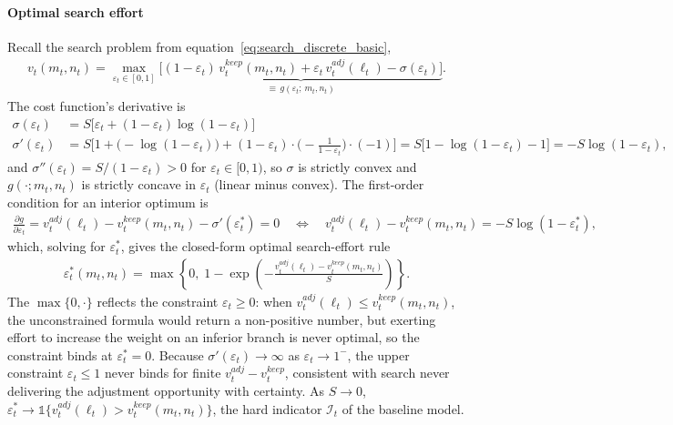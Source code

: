 \paragraph{Optimal search effort}
Recall the search problem from equation~\eqref{eq:search_discrete_basic},
\begin{align}
	v_t(m_t,n_t) = \max_{\varepsilon_t \in [0,1]} \underbrace{\Big[(1-\varepsilon_t)\, v_t^{keep}(m_t,n_t) + \varepsilon_t\, v_t^{adj}(\ell_t) - \sigma(\varepsilon_t)\Big]}_{\equiv\, g(\varepsilon_t;\,m_t,n_t)}.
\end{align}
The cost function's derivative is
\begin{align}
	\sigma(\varepsilon_t) &= S\big[\varepsilon_t + (1-\varepsilon_t)\log(1-\varepsilon_t)\big] \nonumber\\
	\sigma'(\varepsilon_t) &= S\Big[1 + \big(-\log(1-\varepsilon_t)\big) + (1-\varepsilon_t)\cdot\Big(\!-\frac{1}{1-\varepsilon_t}\Big)\cdot(-1)\Big] = S\big[1 - \log(1-\varepsilon_t) - 1\big] = -S\log(1-\varepsilon_t), \label{eq:sigma_prime}
\end{align}
and $\sigma''(\varepsilon_t) = S/(1-\varepsilon_t) > 0$ for $\varepsilon_t \in [0,1)$, so $\sigma$ is strictly convex and $g(\cdot;m_t,n_t)$ is strictly concave in $\varepsilon_t$ (linear minus convex). The first-order condition for an interior optimum is
\begin{align}
	\frac{\partial g}{\partial \varepsilon_t} = v_t^{adj}(\ell_t) - v_t^{keep}(m_t,n_t) - \sigma'(\varepsilon_t^\ast) = 0
	\quad\Longleftrightarrow\quad
	v_t^{adj}(\ell_t) - v_t^{keep}(m_t,n_t) = -S\log(1-\varepsilon_t^\ast),
\end{align}
which, solving for $\varepsilon_t^\ast$, gives the closed-form optimal search-effort rule
\begin{align}
	\varepsilon_t^\ast(m_t,n_t) = \max\left\{0,\; 1 - \exp\left(-\frac{v_t^{adj}(\ell_t) - v_t^{keep}(m_t,n_t)}{S}\right)\right\}. \label{eq:eps_star_basic}
\end{align}
The $\max\{0,\cdot\}$ reflects the constraint $\varepsilon_t \ge 0$: when $v_t^{adj}(\ell_t) \le v_t^{keep}(m_t,n_t)$, the unconstrained formula would return a non-positive number, but exerting effort to increase the weight on an inferior branch is never optimal, so the constraint binds at $\varepsilon_t^\ast=0$. Because $\sigma'(\varepsilon_t)\to\infty$ as $\varepsilon_t\to 1^-$, the upper constraint $\varepsilon_t\le 1$ never binds for finite $v_t^{adj}-v_t^{keep}$, consistent with search never delivering the adjustment opportunity with certainty. As $S \to 0$, $\varepsilon_t^\ast \to \mathbb{1}\{v_t^{adj}(\ell_t) > v_t^{keep}(m_t,n_t)\}$, the hard indicator $\mathcal{I}_t$ of the baseline model.

